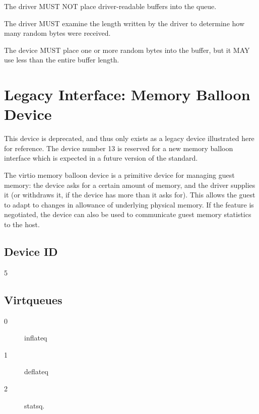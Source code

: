 
The driver MUST NOT place driver-readable buffers into the queue.

The driver MUST examine the length written by the driver to determine
how many random bytes were received.


The device MUST place one or more random bytes into the buffer, but it
MAY use less than the entire buffer length.

\section{Legacy Interface: Memory Balloon Device}\label{sec:Device Types / Memory Balloon Device}

This device is deprecated, and thus only exists as a legacy device
illustrated here for reference.  The device number 13 is reserved for
a new memory balloon interface which is expected in a future version
of the standard.

The virtio memory balloon device is a primitive device for
managing guest memory: the device asks for a certain amount of
memory, and the driver supplies it (or withdraws it, if the device
has more than it asks for). This allows the guest to adapt to
changes in allowance of underlying physical memory. If the
feature is negotiated, the device can also be used to communicate
guest memory statistics to the host.

\subsection{Device ID}\label{sec:Device Types / Memory Balloon Device / Device ID}
  5

\subsection{Virtqueues}\label{sec:Device Types / Memory Balloon Device / Virtqueues}
\begin{description}
\item[0] inflateq
\item[1] deflateq
\item[2] statsq.
\end{description}

